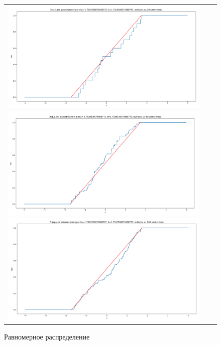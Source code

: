 \begin{figure}[H]
	\begin{tabular}{ccc}
		\includegraphics[scale=0.14]{resources/4_uniform_20.png}
		\includegraphics[scale=0.14]{resources/4_uniform_60.png}
		\includegraphics[scale=0.14]{resources/4_uniform_100.png}
	\end{tabular}
	\caption{Равномерное распределение}
\end{figure}

